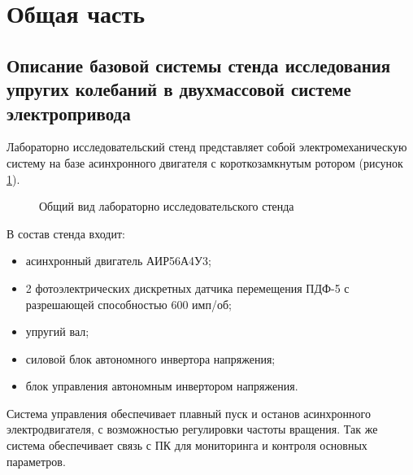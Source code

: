 \section{Общая часть}

    \subsection{Описание базовой системы стенда исследования упругих колебаний %
        в двухмассовой системе электропривода}
        
        Лабораторно исследовательский стенд  представляет собой
        электромеханическую систему на базе асинхронного двигателя с
        короткозамкнутым ротором (рисунок \ref{fig:general-view}).

        \begin{figure}[h!]
            \caption{Общий вид лабораторно исследовательского стенда}
            \label{fig:general-view}
        \end{figure}
        
        В состав стенда входит:
        \begin{itemize}
            \item асинхронный двигатель АИР56А4У3;
            \item 2 фотоэлектрических дискретных датчика перемещения ПДФ-5 с
            разрешающей способностью  600 имп/об;
            \item упругий вал;
            \item силовой блок автономного инвертора напряжения;
            \item блок управления автономным инвертором напряжения.
        \end{itemize}

        Система управления обеспечивает плавный пуск и останов асинхронного
        электродвигателя, с возможностью регулировки частоты вращения. Так же
        система обеспечивает связь с ПК для мониторинга и контроля основных
        параметров.
          
